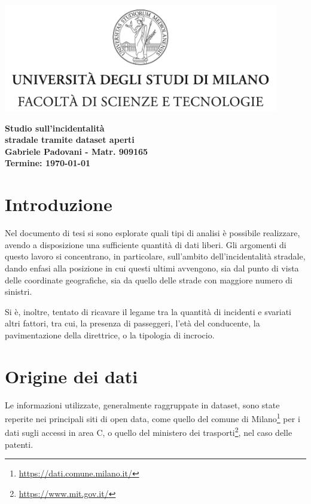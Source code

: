 \documentclass[a4paper]{article}
\begin{document}
\begin{center}
    \includegraphics[width=0.9\textwidth]{../tesi/Logo.jpg}
\end{center}
\vspace{3mm}
\begin{center}
    {\huge{\bf Studio sull'incidentalità}}\\
    \vspace{2mm}
    {\huge{\bf stradale tramite dataset aperti}}\\
    \vspace{3mm}
    {\bf Gabriele Padovani - Matr. 909165}\\
    \vspace{3mm}
    {\bf Termine: \today}\\
\end{center}

\section{Introduzione}

Nel documento di tesi si sono esplorate quali tipi di analisi è possibile realizzare, 
avendo a disposizione una sufficiente quantità di dati liberi. 
Gli argomenti di questo lavoro si concentrano, in particolare, sull'ambito dell'incidentalità 
stradale, dando enfasi alla posizione in cui questi ultimi avvengono, 
sia dal punto di vista delle coordinate geografiche, sia da quello delle strade 
con maggiore numero di sinistri. 

Si è, inoltre, tentato di ricavare il legame tra la quantità di incidenti e svariati altri 
fattori, tra cui, la presenza di passeggeri, l'età del conducente, 
la pavimentazione della direttrice, o la tipologia di incrocio.

\section{Origine dei dati}

Le informazioni utilizzate, generalmente raggruppate in dataset, sono 
state reperite nei principali siti di open data, come quello del comune di 
Milano\footnote{\url{https://dati.comune.milano.it/}} per i dati sugli accessi in area C, 
o quello del ministero dei trasporti\footnote{\url{https://www.mit.gov.it/}}, 
nel caso delle patenti.
\end{document}
